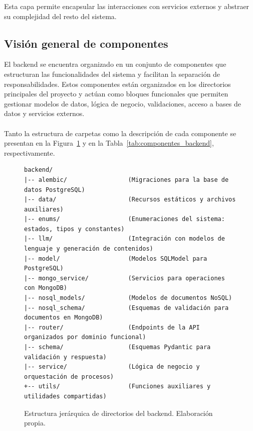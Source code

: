 Esta capa permite encapsular las interacciones con servicios externos y abstraer su complejidad del resto del sistema.

\subsection{Visión general de componentes}

El backend se encuentra organizado en un conjunto de componentes que estructuran las
funcionalidades del sistema y facilitan la separación de responsabilidades. Estos componentes
están organizados en los directorios principales del proyecto y actúan como bloques funcionales que
permiten gestionar modelos de datos, lógica de negocio, validaciones, acceso a bases de datos y
servicios externos.
\\
\\
Tanto la estructura de carpetas como la descripción de cada componente se presentan en la
Figura~\ref{fig:estructura_backend_textual} y en la Tabla~\ref{tab:componentes_backend},
respectivamente.

\begin{figure}[H]
\centering
\begin{verbatim}
backend/
|-- alembic/                 (Migraciones para la base de datos PostgreSQL)
|-- data/                    (Recursos estáticos y archivos auxiliares)
|-- enums/                   (Enumeraciones del sistema: estados, tipos y constantes)
|-- llm/                     (Integración con modelos de lenguaje y generación de contenidos)
|-- model/                   (Modelos SQLModel para PostgreSQL)
|-- mongo_service/           (Servicios para operaciones con MongoDB)
|-- nosql_models/            (Modelos de documentos NoSQL)
|-- nosql_schema/            (Esquemas de validación para documentos en MongoDB)
|-- router/                  (Endpoints de la API organizados por dominio funcional)
|-- schema/                  (Esquemas Pydantic para validación y respuesta)
|-- service/                 (Lógica de negocio y orquestación de procesos)
+-- utils/                   (Funciones auxiliares y utilidades compartidas)
\end{verbatim}
\caption{Estructura jerárquica de directorios del backend. Elaboración propia.}
\label{fig:estructura_backend_textual}
\end{figure}


